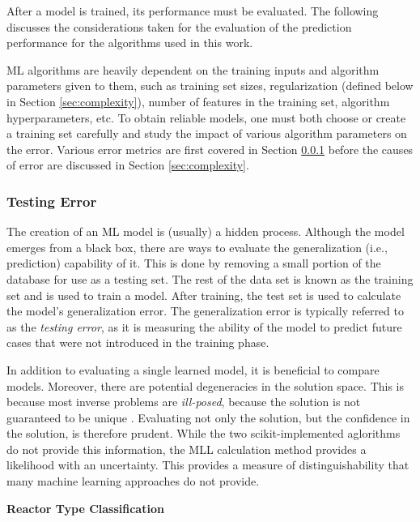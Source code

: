 After a model is trained, its performance must be evaluated. The following
discusses the considerations taken for the evaluation of the prediction
performance for the algorithms used in this work. 

\gls{ML} algorithms are heavily dependent on the training inputs and algorithm
parameters given to them, such as training set sizes, regularization (defined
below in Section \ref{sec:complexity}), number of features in the training set,
algorithm hyperparameters, etc.  To obtain reliable models, one must both
choose or create a training set carefully and study the impact of various
algorithm parameters on the error. Various error metrics are first covered in
Section \ref{sec:testerr} before the causes of error are discussed in Section
\ref{sec:complexity}.

\subsubsection{Testing Error}
\label{sec:testerr}

The creation of an \gls{ML} model is (usually) a hidden process. Although the
model emerges from a black box, there are ways to evaluate the generalization
(i.e., prediction) capability of it.  This is done by removing a small portion
of the database for use as a testing set.  The rest of the data set is known as
the training set and is used to train a model. After training, the test set is
used to calculate the model's generalization error.  The generalization error
is typically referred to as the \textit{testing error}, as it is measuring the
ability of the model to predict future cases that were not introduced in the
training phase.  

In addition to evaluating a single learned model, it is beneficial to compare
models. Moreover, there are potential degeneracies in the solution space. This
is because most inverse problems are \textit{ill-posed}, because the solution
is not guaranteed to be unique \cite{skutnik_2016}.  Evaluating not only the
solution, but the confidence in the solution, is therefore prudent. While the
two scikit-implemented aglorithms do not provide this information, the
\gls{MLL} calculation method provides a likelihood with an uncertainty. This
provides a measure of distinguishability that many machine learning approaches
do not provide. 

\noindent \textbf{Reactor Type Classification}

